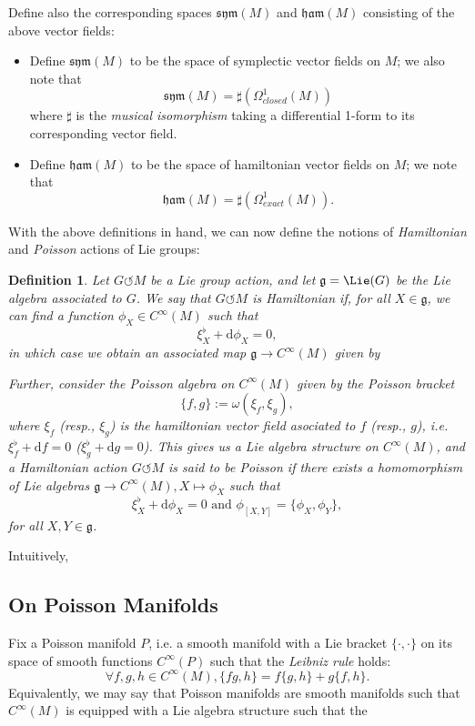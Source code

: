 \documentclass{tufte-handout}
\newtheorem{defn}{Definition}
\def\d{\mathrm{d}}
\begin{document}
Define also the corresponding spaces $\mathfrak{sym}(M)$ and $\mathfrak{ham}(M)$ consisting of the above vector fields:
\begin{itemize}
\item Define $\mathfrak{sym}(M)$ to be the space of symplectic vector fields on $M$; we also note that
$$
\mathfrak{sym}(M) = \sharp(\Omega^1_{closed}(M))
$$
where $\sharp$ is the \emph{musical isomorphism} taking a differential 1-form to its corresponding vector field.

\item Define $\mathfrak{ham}(M)$ to be the space of hamiltonian vector fields on $M$; we note that
$$
\mathfrak{ham}(M) = \sharp(\Omega^1_{exact}(M)).
$$
 \end{itemize}

With the above definitions in hand, we can now define the notions of \emph{Hamiltonian} and \emph{Poisson} actions of Lie groups:
\begin{defn}
Let $G \circlearrowleft M$ be a Lie group action, and let $\mathfrak{g} = \Lie(G)$ be the Lie algebra associated to $G$. We say that $G \circlearrowleft M$ is \emph{Hamiltonian} if, for all $X \in \mathfrak{g}$, we can find a function $\phi_X \in C^\infty(M)$  such that
$$
\xi^\flat_X + \d \phi_X = 0,
$$
in which case we obtain an associated map $\mathfrak{g} \to C^\infty(M)$ given by %

Further, consider the Poisson algebra on $C^\infty(M)$ given by the Poisson bracket
$$
\{f,g\} := \omega(\xi_f, \xi_g),
$$
where $\xi_f$ (resp., $\xi_g$) is the hamiltonian vector field asociated to $f$ (resp., $g$), i.e. $\xi^\flat_f + \d f = 0$ ($\xi^\flat_g + \d g = 0$). This gives us a Lie algebra structure on $C^\infty(M)$, and a Hamiltonian action $G \circlearrowleft M$ is said to be \emph{Poisson} if there exists a homomorphism of Lie algebras $\mathfrak{g} \to C^\infty(M), X \mapsto \phi_X$ such that
$$
\xi^\flat_X + \d \phi_X = 0 \mbox{ and } \phi_{[X,Y]} = \{\phi_X, \phi_Y\},
$$
for all $X,Y \in \mathfrak{g}$.
\end{defn}

Intuitively, %

\subsection{On Poisson Manifolds}
Fix a Poisson manifold $P$, i.e. a smooth manifold with a Lie bracket $\{\cdot,\cdot\}$ on its space of smooth functions $C^\infty(P)$ such that the \emph{Leibniz rule} holds:
$$
\forall f,g,h \in C^\infty(M), \{fg,h\} = f\{g,h\} + g\{f,h\}.
$$
Equivalently, we may say that Poisson manifolds are smooth manifolds such that $C^\infty(M)$ is equipped with a Lie algebra structure such that the %
\end{document}
